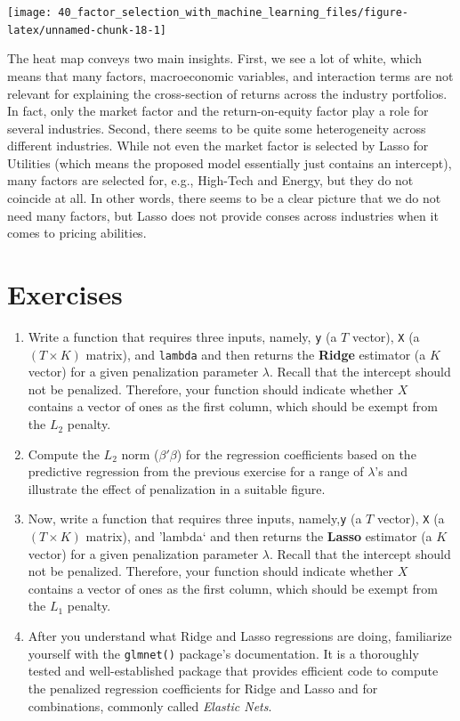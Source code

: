 \documentclass[
]{book}
\providecommand{\tightlist}{%
  \setlength{\itemsep}{0pt}\setlength{\parskip}{0pt}}
\begin{document}
\begin{center}\texttt{[image: 40\_factor\_selection\_with\_machine\_learning\_files/figure-latex/unnamed-chunk-18-1]} \end{center}

The heat map conveys two main insights. First, we see a lot of white, which means that many factors, macroeconomic variables, and interaction terms are not relevant for explaining the cross-section of returns across the industry portfolios. In fact, only the market factor and the return-on-equity factor play a role for several industries. Second, there seems to be quite some heterogeneity across different industries. While not even the market factor is selected by Lasso for Utilities (which means the proposed model essentially just contains an intercept), many factors are selected for, e.g., High-Tech and Energy, but they do not coincide at all. In other words, there seems to be a clear picture that we do not need many factors, but Lasso does not provide conses across industries when it comes to pricing abilities.

\hypertarget{exercises-8}{%
\section{Exercises}\label{exercises-8}}

\begin{enumerate}
\def\labelenumi{\arabic{enumi}.}
\tightlist
\item
  Write a function that requires three inputs, namely, \texttt{y} (a \(T\) vector), \texttt{X} (a \((T \times K)\) matrix), and \texttt{lambda} and then returns the \textbf{Ridge} estimator (a \(K\) vector) for a given penalization parameter \(\lambda\). Recall that the intercept should not be penalized. Therefore, your function should indicate whether \(X\) contains a vector of ones as the first column, which should be exempt from the \(L_2\) penalty.
\item
  Compute the \(L_2\) norm (\(\beta'\beta\)) for the regression coefficients based on the predictive regression from the previous exercise for a range of \(\lambda\)'s and illustrate the effect of penalization in a suitable figure.
\item
  Now, write a function that requires three inputs, namely,\texttt{y} (a \(T\) vector), \texttt{X} (a \((T \times K)\) matrix), and 'lambda` and then returns the \textbf{Lasso} estimator (a \(K\) vector) for a given penalization parameter \(\lambda\). Recall that the intercept should not be penalized. Therefore, your function should indicate whether \(X\) contains a vector of ones as the first column, which should be exempt from the \(L_1\) penalty.
\item
  After you understand what Ridge and Lasso regressions are doing, familiarize yourself with the \texttt{glmnet()} package's documentation. It is a thoroughly tested and well-established package that provides efficient code to compute the penalized regression coefficients for Ridge and Lasso and for combinations, commonly called \emph{Elastic Nets}.
\end{enumerate}
\end{document}
